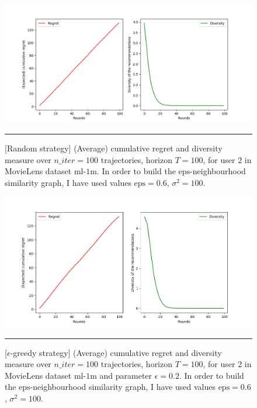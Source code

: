 \documentclass{article}
\begin{document}
\begin{figure}[H]
  \centering
  \rule[-.5cm]{0cm}{4cm}
  \includegraphics[scale=0.5]{../Results/random_4min40sec.png}
  \rule[-.5cm]{4cm}{0cm}
  \caption{[Random strategy] (Average) cumulative regret and diversity measure over $n\_iter=100$ trajectories, horizon $T=100$, for user $2$ in MovieLens dataset $\text{ml-1m}$. In order to build the $\text{eps}$-neighbourhood similarity graph, I have used values $\text{eps}=0.6$, $\sigma^{2}=100$.}
\end{figure}

\begin{figure}[H]
  \centering
  \rule[-.5cm]{0cm}{4cm}
  \includegraphics[scale=0.5]{../Results/greedy_51min6sec.png}
  \rule[-.5cm]{4cm}{0cm}
  \caption{[$\epsilon$-greedy strategy] (Average) cumulative regret and diversity measure over $n\_iter=100$ trajectories, horizon $T=100$, for user $2$ in MovieLens dataset $\text{ml-1m}$ and parameter $\epsilon=0.2$. In order to build the $\text{eps}$-neighbourhood similarity graph, I have used values $\text{eps}=0.6$, $\sigma^{2}=100$.}
\end{figure}
\end{document}
